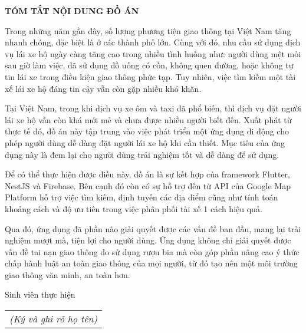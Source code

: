 \documentclass[../DoAn.tex]{subfiles}
\begin{document}
\begin{center}
    \Large{\textbf{TÓM TẮT NỘI DUNG ĐỒ ÁN}}\\
\end{center}
\vspace{1cm}
Trong những năm gần đây, số lượng phương tiện giao thông tại 
Việt Nam tăng nhanh chóng, đặc biệt là ở các thành phố lớn. 
Cùng với đó, nhu cầu sử dụng dịch vụ lái xe hộ ngày càng tăng 
cao trong nhiều tình huống như: người dùng mệt mỏi sau giờ làm 
việc, đã sử dụng đồ uống có cồn, không quen đường, hoặc không tự 
tin lái xe trong điều kiện giao thông phức tạp. Tuy nhiên, việc tìm 
kiếm một tài xế lái xe hộ đáng tin cậy vẫn còn gặp nhiều khó khăn.

Tại Việt Nam, trong khi dịch vụ xe ôm và taxi đã phổ biến, 
thì dịch vụ đặt người lái xe hộ vẫn còn khá mới mẻ và chưa được 
nhiều người biết đến. Xuất phát từ thực tế đó, đồ án này tập trung 
vào việc phát triển một ứng dụng di động cho phép người dùng 
dễ dàng đặt người lái xe hộ khi cần thiết.
Mục tiêu của ứng dụng này là đem lại cho người dùng trải nghiệm tốt 
và dễ dàng để sử dụng.

Để có thể thực hiện được điều này, đồ án là sự kết hợp của framework Flutter, NestJS và Firebase.
Bên cạnh đó còn có sự hỗ trợ đến từ API của Google Map Platform hỗ trợ 
việc tìm kiếm, định tuyến các địa điểm cũng như tính toán khoảng cách và độ ưu tiên trong việc phân phối tài xế 1 cách hiệu quả.

Qua đó, ứng dụng đã phần nào giải quyết được các vấn đề ban đầu, mang lại trải nghiệm mượt mà, tiện lợi cho người dùng.
Ứng dụng không chỉ giải quyết được vấn đề tai nạn giao thông do sử dụng rượu bia mà còn góp phần nâng cao ý thức chấp hành luật an toàn giao thông của mọi người, từ đó tạo nên một môi trường giao thông văn minh, an toàn hơn.
\begin{flushright}
Sinh viên thực hiện\\
\begin{tabular}{@{}c@{}}
\textit{(Ký và ghi rõ họ tên)}
\end{tabular}
\end{flushright}
\end{document}
